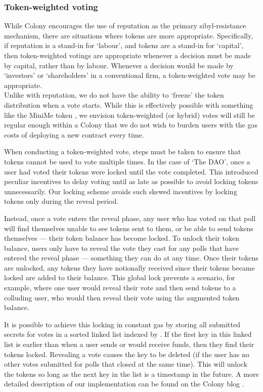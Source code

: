 \subsubsection*{Token-weighted voting}

While Colony encourages the use of reputation as the primary sibyl-resistance mechanism, there are situations where tokens are more appropriate. Specifically, if reputation is a stand-in for `labour', and tokens are a stand-in for `capital', then token-weighted votings are appropriate whenever a decision must be made by capital, rather than by labour. Whenever a decision would be made by `investors' or `shareholders' in a conventional firm, a token-weighted vote may be appropriate. \\

Unlike with reputation, we do not have the ability to `freeze' the token distribution when a vote starts. While this is effectively possible with something like the MiniMe token \cite{minime}, we envision token-weighted (or hybrid) votes will still be regular enough within a Colony that we do not wish to burden users with the gas costs of deploying a new contract every time.

When conducting a token-weighted vote, steps must be taken to ensure that tokens cannot be used to vote multiple times. In the case of `The DAO', once a user had voted their tokens were locked until the vote completed. This introduced peculiar incentives to delay voting until as late as possible to avoid locking tokens unnecessarily.  Our locking scheme avoids such skewed incentives by locking tokens only during the reveal period.

Instead, once a vote enters the reveal phase, any user who has voted on that poll will find themselves unable to see tokens sent to them, or be able to send tokens themselves --- their token balance has become locked. To unlock their token balance, users only have to reveal the vote they cast for any polls that have entered the reveal phase --- something they can do at any time. Once their tokens are unlocked, any tokens they have notionally received since their tokens became locked are added to their balance. This global lock prevents a scenario, for example, where one user would reveal their vote and then send tokens to a colluding user, who would then reveal their vote using the augmented token balance.

It is possible to achieve this locking in constant gas by storing all submitted secrets for votes in a sorted linked list indexed by . If the first key in this linked list is earlier than  when a user sends or would receive funds, then they find their tokens locked. Revealing a vote causes the key to be deleted (if the user has no other votes submitted for polls that closed at the same time). This will unlock the tokens so long as the next key in the list is a timestamp in the future. A more detailed description of our implementation can be found on the Colony blog \cite{ColonyVoting}.

